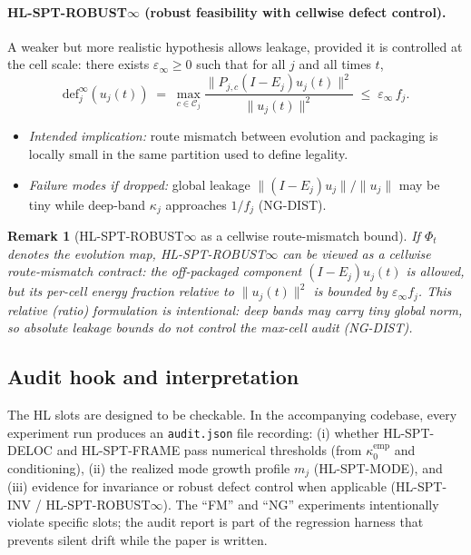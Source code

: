 \documentclass[11pt]{article}
\newtheorem{remark}[definition]{Remark}
\begin{document}
\paragraph{\textbf{HL-SPT-ROBUST$\infty$} (robust feasibility with cellwise defect control).}
A weaker but more realistic hypothesis allows leakage, provided it is controlled at the cell scale:
there exists $\varepsilon_\infty\ge 0$ such that for all $j$ and all times $t$,
\begin{equation}\label{eq:HL-ROBUST}
\mathrm{def}^{\infty}_j(u_j(t))
\;=\;
\max_{c\in\mathcal{C}_j}\frac{\|P_{j,c}(I-E_j)u_j(t)\|^2}{\|u_j(t)\|^2}
\;\le\;
\varepsilon_\infty\, f_j.
\end{equation}
\begin{itemize}
\item \emph{Intended implication:} route mismatch between evolution and packaging is locally small in the same partition used to define legality.
\item \emph{Failure modes if dropped:} global leakage $\|(I-E_j)u_j\|/\|u_j\|$ may be tiny while deep-band $\kappa_j$ approaches $1/f_j$ (NG-DIST).
\end{itemize}

\begin{remark}[HL-SPT-ROBUST$\infty$ as a cellwise route-mismatch bound]\label{rem:robust-contract}
If $\Phi_t$ denotes the evolution map, HL-SPT-ROBUST$\infty$ can be viewed as a \emph{cellwise} route-mismatch contract:
the off-packaged component $(I-E_j)u_j(t)$ is allowed, but its per-cell energy fraction relative to $\|u_j(t)\|^2$ is bounded by $\varepsilon_\infty f_j$.
This relative (ratio) formulation is intentional: deep bands may carry tiny global norm, so absolute leakage bounds do not control the max-cell audit (NG-DIST).
\end{remark}

\subsection{Audit hook and interpretation}

The HL slots are designed to be checkable.
In the accompanying codebase, every experiment run produces an \texttt{audit.json} file recording:
(i) whether HL-SPT-DELOC and HL-SPT-FRAME pass numerical thresholds (from $\kappa^{\mathrm{emp}}_0$ and conditioning),
(ii) the realized mode growth profile $m_j$ (HL-SPT-MODE), and
(iii) evidence for invariance or robust defect control when applicable (HL-SPT-INV / HL-SPT-ROBUST$\infty$).
The ``FM'' and ``NG'' experiments intentionally violate specific slots; the audit report is part of the regression harness that prevents silent drift while the paper is written.
\end{document}
